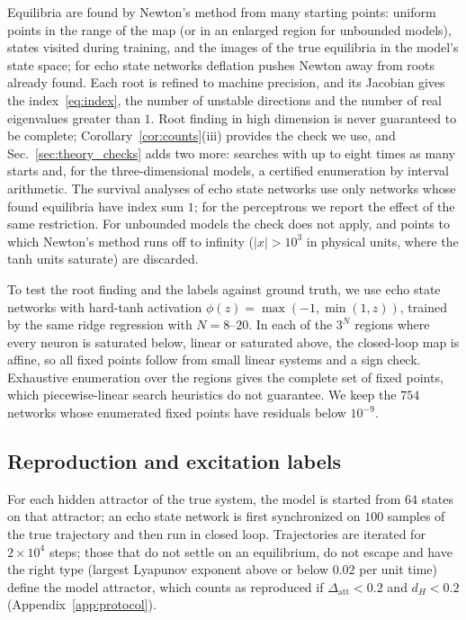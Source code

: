 Equilibria are found by Newton's method from many starting points: uniform points in the range of the map (or in an
enlarged region for unbounded models), states visited during training, and the images of the true equilibria in the
model's state space; for echo state networks deflation\cite{Farrell2015Deflation} pushes Newton away from roots already found.
Each root is refined to machine precision, and its Jacobian gives the index~\eqref{eq:index}, the number of unstable
directions and the number of real eigenvalues greater than $1$. Root finding in high dimension is never guaranteed to be
complete;\cite{SussilloBarak2013,AllgowerGeorg2003Continuation} Corollary~\ref{cor:counts}(iii) provides the check we use,
and Sec.~\ref{sec:theory_checks} adds two more: searches with up to eight times as many starts and, for the
three-dimensional models, a certified enumeration by interval arithmetic.
The survival analyses of echo state networks use only networks whose found equilibria have index sum $1$; for the
perceptrons we report the effect of the same restriction. For unbounded models the
check does not apply, and points to which Newton's method runs off to infinity ($|x|>10^3$ in physical units, where the tanh
units saturate) are discarded.

To test the root finding and the labels against ground truth, we use echo state networks with hard-tanh activation
$\phi(z)=\max(-1,\min(1,z))$, trained by the same ridge regression with $N=8$--$20$. In each of the $3^N$ regions where
every neuron is saturated below, linear or saturated above, the closed-loop map is affine, so all fixed points follow from
small linear systems and a sign check. Exhaustive enumeration over the regions gives the complete set of fixed points,
which piecewise-linear search heuristics do not guarantee.\cite{Eisenmann2023Bifurcations} We keep the $754$ networks whose
enumerated fixed points have residuals below $10^{-9}$.

\subsection{Reproduction and excitation labels}
\label{sec:protocol}

For each hidden attractor of the true system, the model is started from $64$ states on that attractor; an echo state
network is first synchronized on $100$ samples of the true trajectory and then run in closed loop. Trajectories are
iterated for $2\times10^4$ steps; those that do not settle on an equilibrium, do not escape and have the right type (largest
Lyapunov exponent above or below $0.02$ per unit time) define the model attractor, which counts as reproduced if
$\Delta_{\mathrm{att}}<0.2$ and $d_H<0.2$ (Appendix~\ref{app:protocol}).

